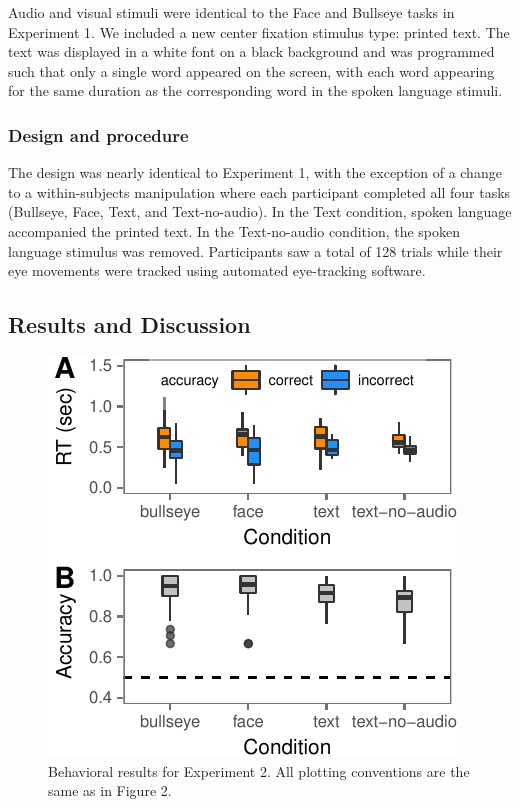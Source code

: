 \documentclass[english,man]{apa6}
\theoremstyle{definition}
\theoremstyle{definition}
\theoremstyle{definition}
\theoremstyle{remark}
\begin{document}
Audio and visual stimuli were identical to the Face and Bullseye tasks
in Experiment 1. We included a new center fixation stimulus type:
printed text. The text was displayed in a white font on a black
background and was programmed such that only a single word appeared on
the screen, with each word appearing for the same duration as the
corresponding word in the spoken language stimuli.

\hypertarget{design-and-procedure-1}{%
\subsubsection{Design and procedure}\label{design-and-procedure-1}}

The design was nearly identical to Experiment 1, with the exception of a
change to a within-subjects manipulation where each participant
completed all four tasks (Bullseye, Face, Text, and Text-no-audio). In
the Text condition, spoken language accompanied the printed text. In the
Text-no-audio condition, the spoken language stimulus was removed.
Participants saw a total of 128 trials while their eye movements were
tracked using automated eye-tracking software.

\hypertarget{results-and-discussion-2}{%
\subsection{Results and Discussion}\label{results-and-discussion-2}}

\begin{figure}[t]

{\centering \includegraphics[width=0.8\linewidth]{figs/text-plot-print-1} 

}

\caption{Behavioral results for Experiment 2. All plotting conventions are the same as in Figure 2.}\label{fig:text-plot-print}
\end{figure}
\end{document}
